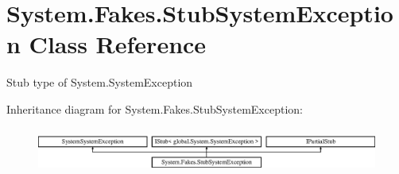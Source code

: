 \hypertarget{class_system_1_1_fakes_1_1_stub_system_exception}{\section{System.\-Fakes.\-Stub\-System\-Exception Class Reference}
\label{class_system_1_1_fakes_1_1_stub_system_exception}
}


Stub type of System.\-System\-Exception 


Inheritance diagram for System.\-Fakes.\-Stub\-System\-Exception\-:\begin{figure}[H]
\begin{center}
\leavevmode
\includegraphics[height=1.499331cm]{class_system_1_1_fakes_1_1_stub_system_exception}
\end{center}
\end{figure}
